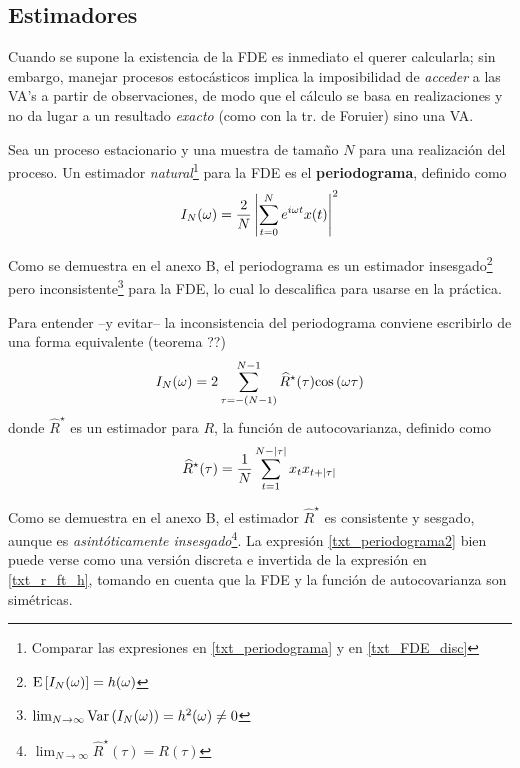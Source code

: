 
\subsection{Estimadores}

Cuando se supone la existencia de la FDE es inmediato el querer calcularla; sin embargo, manejar 
procesos estocásticos implica la imposibilidad de \textit{acceder} a las VA's a partir de 
observaciones, de modo que el cálculo se basa en realizaciones y no da lugar a un resultado 
\textit{exacto} (como con la tr. de Foruier) sino una VA.

Sea \xt un proceso estacionario y \xtd una muestra de tamaño $N$ para una realización del proceso.
%
Un estimador \textit{natural}\footnote{Comparar las expresiones en \ref{txt_periodograma} y en 
\ref{txt_FDE_disc}} para la FDE es el \textbf{periodograma}, definido como
\begin{equation}
I_N(\omega) = \frac{2}{N} \left| \sum_{t = 0}^{N} e^{i \omega t} x(t) \right|^{2}
\label{txt_periodograma}
\end{equation}

Como se demuestra en el anexo B, el periodograma es un estimador 
insesgado\footnote{$\mathrm{E}\left[ I_N(\omega) \right]=h(\omega)$} pero 
inconsistente\footnote{$\lim_{N\rightarrow\infty} \mathrm{Var}\left( I_N(\omega) \right) = h^{2}(\omega) \neq 0$} para
la FDE, lo cual lo descalifica para usarse en la práctica.

Para entender --y evitar-- la inconsistencia del periodograma conviene escribirlo de una forma
equivalente (teorema ??)
\begin{equation}
I_N(\omega) = 2 \sum_{\tau = -(N-1)}^{N-1} \widehat{R}^{\star}(\tau) \mathrm{cos}\left( \omega \tau \right)
\label{txt_periodograma2}
\end{equation}
%
donde $\widehat{R}^{\star}$ es un estimador para $R$, la función de autocovarianza, 
definido como
\begin{equation}
\widehat{R}^{\star} (\tau) = \frac{1}{N} \sum_{t = 1}^{N-\left| \tau \right|} x_t x_{t+\left| \tau \right|}
\end{equation}

Como se demuestra en el anexo B, el estimador $\widehat{R}^{\star}$ es consistente y sesgado, aunque
es \textit{asintóticamente insesgado}\footnote{$\lim_{N\rightarrow \infty} 
\widehat{R}^{\star}(\tau) = R(\tau)$}.
%
La expresión \ref{txt_periodograma2} bien puede verse como una versión discreta e invertida de la 
expresión en \ref{txt_r_ft_h}, tomando en cuenta que la FDE y la función de autocovarianza son 
simétricas. 


